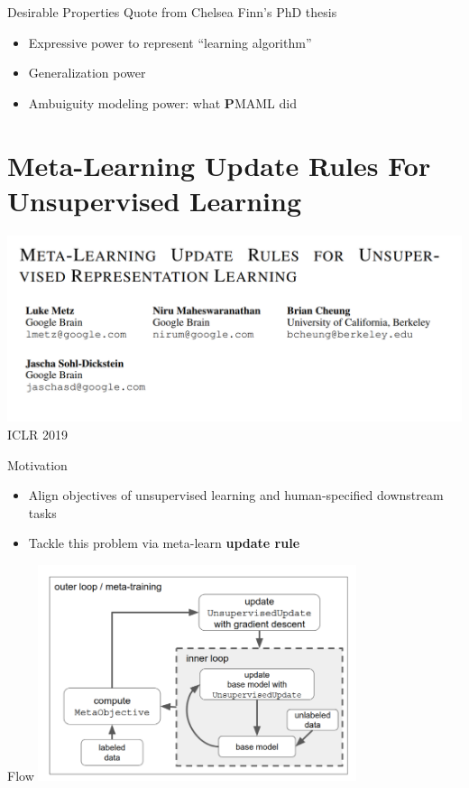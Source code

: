 \documentclass{beamer}
\begin{document}
\begin{frame}{Desirable Properties}
  Quote from Chelsea Finn's PhD thesis
  \begin{itemize}
    \item Expressive power to represent ``learning algorithm''
    \item Generalization power
    \item Ambuiguity modeling power: what \textbf{P}MAML did
  \end{itemize}
\end{frame}


\section{Meta-Learning Update Rules For Unsupervised Learning}
\begin{frame}
  \includegraphics[width=\textwidth]{fig/title.png}
  \center ICLR 2019
\end{frame}

\begin{frame}{Motivation}
  \begin{itemize}
    \item Align objectives of unsupervised learning and human-specified downstream tasks
    \item Tackle this problem via meta-learn \textbf{update rule}
  \end{itemize}
\end{frame}

\begin{frame}{Flow}
  \center \includegraphics[width=0.7\textwidth]{fig/flow.png}
\end{frame}
\end{document}
